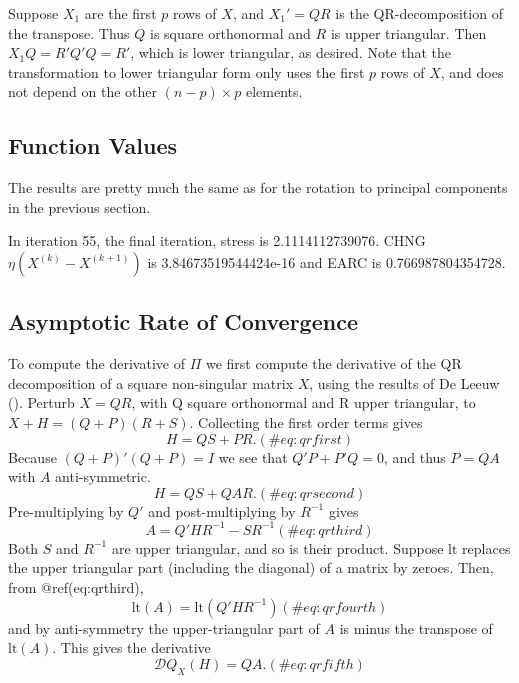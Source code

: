 \documentclass[
  12pt,
  letterpaper,
  DIV=11,
  numbers=noendperiod]{scrartcl}
\begin{document}
Suppose \(X_1\) are the first \(p\) rows of \(X\), and \(X_1'=QR\) is
the QR-decomposition of the transpose. Thus \(Q\) is square orthonormal
and \(R\) is upper triangular. Then \(X_1Q=R'Q'Q=R'\), which is lower
triangular, as desired. Note that the transformation to lower triangular
form only uses the first \(p\) rows of \(X\), and does not depend on the
other \((n - p)\times p\) elements.

\subsection{Function Values}\label{function-values-2}

The results are pretty much the same as for the rotation to principal
components in the previous section.

In iteration 55, the final iteration, stress is 2.1114112739076. CHNG
\(\eta(X^{(k)}-X^{(k+1)})\) is 3.84673519544424e-16 and EARC is
0.766987804354728.

\subsection{Asymptotic Rate of
Convergence}\label{asymptotic-rate-of-convergence-2}

To compute the derivative of \(\Pi\) we first compute the derivative of
the QR decomposition of a square non-singular matrix \(X\), using the
results of De Leeuw (). Perturb
\(X=QR\), with Q square orthonormal and R upper triangular, to
\(X+H=(Q+P)(R+S)\). Collecting the first order terms gives
\begin{equation}
H=QS+PR.
(\#eq:qrfirst)
\end{equation} Because \((Q+P)'(Q+P)=I\) we see that \(Q'P+P'Q=0\), and
thus \(P=QA\) with \(A\) anti-symmetric. \begin{equation}
H=QS+QAR.
(\#eq:qrsecond)
\end{equation} Pre-multiplying by \(Q'\) and post-multiplying by
\(R^{-1}\) gives \begin{equation}
A=Q'HR^{-1}-SR^{-1}
(\#eq:qrthird)
\end{equation} Both \(S\) and \(R^{-1}\) are upper triangular, and so is
their product. Suppose \(\text{lt}\) replaces the upper triangular part
(including the diagonal) of a matrix by zeroes. Then, from
@ref(eq:qrthird), \begin{equation}
\text{lt}(A)=\text{lt}(Q'HR^{-1})
(\#eq:qrfourth)
\end{equation} and by anti-symmetry the upper-triangular part of \(A\)
is minus the transpose of \(\text{lt}(A)\). This gives the derivative
\begin{equation}
\mathcal{D}Q_X(H)=QA.
(\#eq:qrfifth)
\end{equation}
\end{document}
